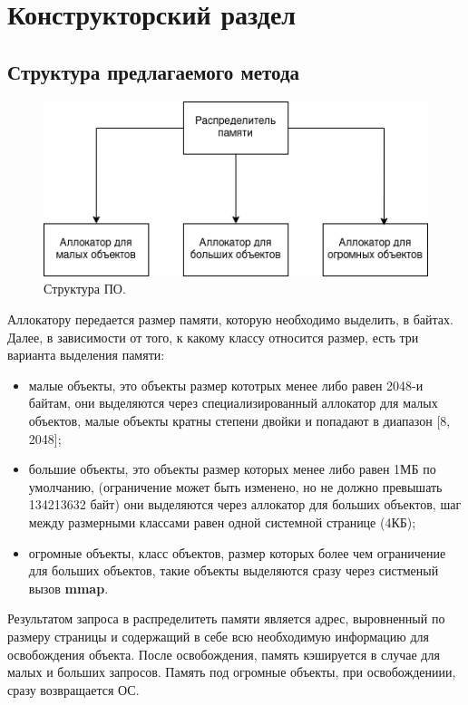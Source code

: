 \chapter{Конструкторский раздел}
\section{Структура предлагаемого метода}

\begin{figure}[!h]
	\begin{center}
		\includegraphics[scale=0.5]{images/structure.png}
		\caption{Структура ПО.}
		\label{structure}
	\end{center}
\end{figure}

Аллокатору передается размер памяти, которую необходимо выделить, в байтах. Далее, в зависимости от того, к какому классу относится размер, есть три варианта выделения памяти:
\begin{itemize}
	\item малые объекты, это объекты размер кототрых менее либо равен 2048-и байтам, они выделяются через специализированный аллокатор для малых объектов, малые объекты кратны степени двойки и попадают в диапазон [8, 2048];
	\item большие объекты, это объекты размер которых менее либо равен 1МБ по умолчанию, (ограничение может быть изменено, но не должно превышать 134213632 байт) они выделяются через аллокатор для больших объектов, шаг между размерными классами равен одной системной странице (4КБ);
	\item огромные объекты, класс объектов, размер которых более чем ограничение для больших объектов, такие объекты выделяются сразу через систменый вызов \textbf{mmap}.
\end{itemize}

Результатом запроса в распределитеть памяти является адрес, выровненный по размеру страницы и содержащий в себе всю необходимую информацию для освобождения объекта. После освобождения, память кэшируется в случае для малых и больших запросов. Память под огромные объекты, при освобождениии, сразу возвращается ОС.

